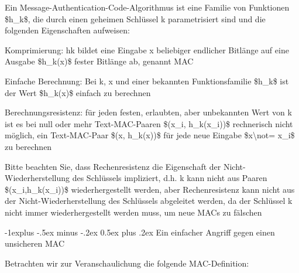 \documentclass[a4paper]{article}
\makeatletter
\renewcommand{\subsection}{\@startsection{subsection}{2}{0mm}%
 {-1explus -.5ex minus -.2ex}%
 {0.5ex plus .2ex}%
 {\normalfont\normalsize\bfseries}}
\makeatother
\begin{document}
\begin{multicols}{3}
\begin{itemize*}
            \begin{itemize*}
                  \item Ein Message-Authentication-Code-Algorithmus ist eine Familie von Funktionen \$h\_k\$, die durch einen geheimen Schlüssel k parametrisiert sind und die folgenden Eigenschaften aufweisen:
                  \begin{itemize*} \item Komprimierung: hk bildet eine Eingabe x beliebiger endlicher Bitlänge auf eine Ausgabe \$h\_k(x)\$ fester Bitlänge ab, genannt MAC \item Einfache Berechnung: Bei k, x und einer bekannten Funktionsfamilie \$h\_k\$ ist der Wert \$h\_k(x)\$ einfach zu berechnen \item Berechnungsresistenz: für jeden festen, erlaubten, aber unbekannten Wert von k ist es bei null oder mehr Text-MAC-Paaren \$(x\_i, h\_k(x\_i))\$ rechnerisch nicht möglich, ein Text-MAC-Paar \$(x, h\_k(x))\$ für jede neue Eingabe \$x\textbackslash not= x\_i\$ zu berechnen \end{itemize*}
                  \item Bitte beachten Sie, dass Rechenresistenz die Eigenschaft der Nicht-Wiederherstellung des Schlüssels impliziert, d.h. k kann nicht aus Paaren \$(x\_i,h\_k(x\_i))\$ wiederhergestellt werden, aber Rechenresistenz kann nicht aus der Nicht-Wiederherstellung des Schlüssels abgeleitet werden, da der Schlüssel k nicht immer wiederhergestellt werden muss, um neue MACs zu fälschen
            \end{itemize*}
      \end{itemize*}


      \subsection{Ein einfacher Angriff gegen einen unsicheren
            MAC}

      \begin{itemize*}
            \item
            Betrachten wir zur Veranschaulichung die folgende MAC-Definition:


\end{itemize*}
\end{multicols}
\end{document}

